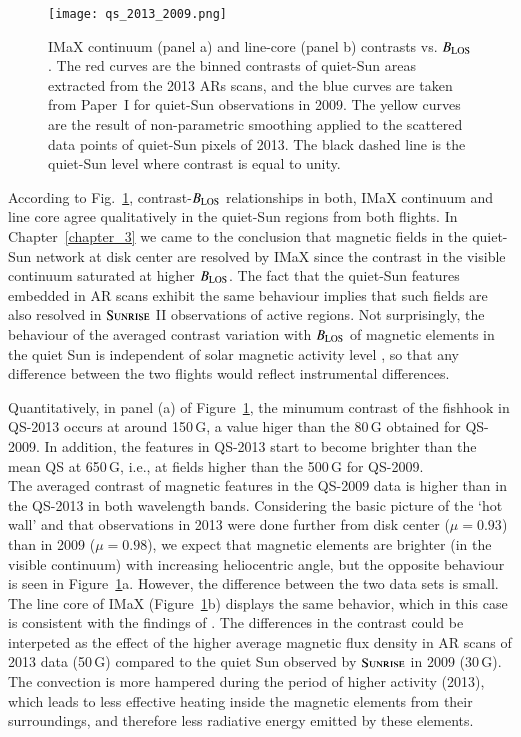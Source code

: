 \documentclass[goettingen, gauss, print]{thesis}
\begin{document}
\begin{figure*}[ht!]
\centering
\hspace*{-1.05cm}\texttt{[image: qs\_2013\_2009.png]}
\caption{IMaX continuum (panel a) and line-core (panel b) contrasts vs. $B_{\rm LOS}$. The red curves are the binned contrasts of quiet-Sun areas extracted from the 2013 ARs scans, and the blue curves are taken from Paper~I for quiet-Sun observations in 2009. The yellow curves are the result of non-parametric smoothing applied to the scattered data points of quiet-Sun pixels of 2013. The black dashed line is the quiet-Sun level where contrast is equal to unity.}
\label{qs_2009_2013}
\end{figure*}


According to Fig.~\ref{qs_2009_2013}, contrast-$B_{\rm LOS}$ relationships in both, IMaX continuum and line core agree qualitatively in the quiet-Sun regions from both flights.
In Chapter~\ref{chapter_3} we came to the conclusion that magnetic fields in the quiet-Sun network at disk center are resolved by IMaX since the contrast in the visible continuum saturated at higher $B_{\rm LOS}$. The fact that the quiet-Sun features embedded in AR scans exhibit the same behaviour implies that such fields are also resolved in $\textsc{Sunrise}$ II observations of active regions.
Not surprisingly, the behaviour of the averaged contrast variation with $B_{\rm LOS}$ of magnetic elements in the quiet Sun is independent of solar magnetic activity level \citep{ortiz_intensity_2006}, so that any difference between the two flights would reflect instrumental differences.

Quantitatively, in panel (a) of Figure~\ref{qs_2009_2013}, the minumum contrast of the fishhook in QS-2013 occurs at around 150\,G, a value higer than the 80\,G obtained for QS-2009. In addition, the features in QS-2013 start to become brighter than the mean QS at 650\,G, i.e., at fields higher than the 500\,G for QS-2009. \\ 
The averaged contrast of magnetic features in the QS-2009 data is higher than in the QS-2013 in both wavelength bands. Considering the basic picture of the `hot wall' and that observations in 2013 were done further from disk center ($\mu=0.93$) than in 2009 ($\mu = 0.98$), we expect that magnetic elements are brighter (in the visible continuum) with increasing heliocentric angle, but the opposite behaviour is seen in Figure~\ref{qs_2009_2013}a. However, the difference between the two data sets is small. The line core of IMaX (Figure~\ref{qs_2009_2013}b) displays the same behavior, which in this case is consistent with the findings of \cite{yeo_intensity_2013}.
The differences in the contrast could be interpeted as the effect of the higher average magnetic flux density in AR scans of 2013 data (50\,G) compared to the quiet Sun observed by $\textsc{Sunrise}$ in 2009 (30\,G). The convection is more hampered during the period of higher activity (2013), which leads to less effective heating inside the magnetic elements from their surroundings, and therefore less radiative energy emitted by these elements. 
\end{document}
